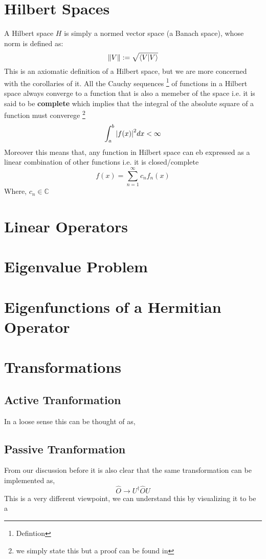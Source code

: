 \section{Hilbert Spaces}
A Hilbert space $H$ is simply a normed vector space (a Banach space), whose norm is defined as:
\begin{equation} \label{norm}
\norm{V} := \sqrt{\braket{V}{V}}
\end{equation}
This is an axiomatic definition of a Hilbert space, but we are more concerned with the corollaries of it. All the Cauchy sequences \footnote{Defintion} of functions in a Hilbert space always converge to a function that is also a memeber of the space i.e. it is said to be \textbf{complete} which implies that the integral of the absolute square of a function must converege \footnote{we simply state this but a proof can be found in}
\begin{equation}
\int_{a}^{b} \abs{f(x)}^{2} dx < \infty
\end{equation}
Moreover this means that, any function in Hilbert space can eb expressed as a linear combination of other functions i.e. it is closed/complete
\begin{equation}
f(x) = \sum_{n = 1}^{\infty} c_{n} f_{n}(x)
\end{equation}
Where, $c_{n} \in \mathbb{C}$
\section{Linear Operators}
\section{Eigenvalue Problem}
\section{Eigenfunctions of a Hermitian Operator}

\section{Transformations}
\subsection{Active Tranformation}
In a loose sense this can be thought of as,

\subsection{Passive Tranformation}
From our discussion before it is also clear that the same transformation can be implemented as,
\begin{equation}
\hat{O} \rightarrow U^{\dagger}\hat{O}U
\end{equation}
This is a very different viewpoint, we can understand this by visualizing it to be a 
